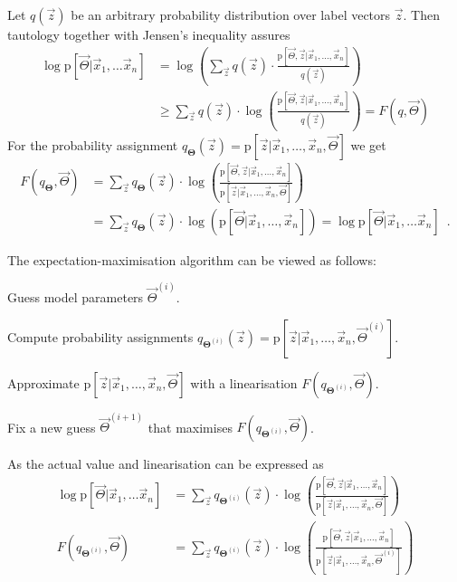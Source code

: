 \documentclass[landscape,footrule]{foils}
\newcommand{\pd}[1]{\mathrm{p}[#1]}
\begin{document}
\enlargethispage{1cm}
Let $q(\vec{z})$ be an arbitrary probability distribution over label vectors $\vec{z}$.
Then tautology together with Jensen's inequality assures 
\begin{align*}
\log \pd{\vec{\Theta}|\vec{x}_1,\ldots\vec{x}_n}%
&=\log\left(\sum_{\vec{z}}q(\vec{z})\cdot\frac{\pd{\vec{\Theta}, \vec{z}|\vec{x}_1,\ldots,\vec{x}_n}}{q(\vec{z})}\right)\\
&\geq \sum_{\vec{z}}q(\vec{z})\cdot\log\left(\frac{\pd{\vec{\Theta},\vec{z}|\vec{x}_1,\ldots,\vec{x}_n}}{q(\vec{z})}\right)=F(q,\vec{\Theta})
\end{align*}
For the probability assignment $q_{\boldsymbol{\Theta}}(\vec{z})=\pd{\vec{z}|\vec{x}_1,\ldots,\vec{x}_n, \vec{\Theta}}$ we get
\begin{align*}
F(q_{\boldsymbol{\Theta}},\vec{\Theta})
&=\sum_{\vec{z}}q_{\boldsymbol{\Theta}}(\vec{z})\cdot\log\left(\frac{\pd{\vec{\Theta},\vec{z}|\vec{x}_1,\ldots,\vec{x}_n}}{\pd{\vec{z}|\vec{x}_1,\ldots,\vec{x}_n, \vec{\Theta}}}\right)\\
&=\sum_{\vec{z}}q_{\boldsymbol{\Theta}}(\vec{z})\cdot\log\left(\pd{\vec{\Theta}|\vec{x}_1,\ldots,\vec{x}_n}\right)
= \log \pd{\vec{\Theta}|\vec{x}_1,\ldots\vec{x}_n}\enspace.
\end{align*}


The expectation-maximisation algorithm can be viewed as follows:
\begin{triangles}
\item Guess model parameters $\vec{\Theta}^{(i)}$.
\item Compute probability assignments $q_{\boldsymbol{\Theta}^{(i)}}(\vec{z})=\pd{\vec{z}|\vec{x}_1,\ldots,\vec{x}_n, \vec{\Theta}^{(i)}}$.
\item Approximate $\pd{\vec{z}|\vec{x}_1,\ldots,\vec{x}_n, \vec{\Theta}}$ with a linearisation $F(q_{\boldsymbol{\Theta}^{(i)}},\vec{\Theta})$.
\item Fix a new guess $\vec{\Theta}^{(i+1)}$ that maximises $F(q_{\boldsymbol{\Theta}^{(i)}},\vec{\Theta})$. 
\end{triangles}
\vspace*{1cm}


As the actual value and linearisation can be expressed as
\begin{align*}
\log \pd{\vec{\Theta}|\vec{x}_1,\ldots\vec{x}_n}
&=\sum_{\vec{z}}q_{\boldsymbol{\Theta}^{(i)}}(\vec{z})\cdot\log\left(\frac{\pd{\vec{\Theta},\vec{z}|\vec{x}_1,\ldots,\vec{x}_n}}{\pd{\vec{z}|\vec{x}_1,\ldots,\vec{x}_n, \vec{\Theta}}}\right) \\
F(q_{\boldsymbol{\Theta}^{(i)}},\vec{\Theta})&= \sum_{\vec{z}}q_{\boldsymbol{\Theta}^{(i)}}(\vec{z})\cdot\log\left(\frac{\pd{\vec{\Theta},\vec{z}|\vec{x}_1,\ldots,\vec{x}_n}}{\pd{\vec{z}|\vec{x}_1,\ldots,\vec{x}_n, \vec{\Theta}^{(i)}}}\right)
\end{align*}
\end{document}
